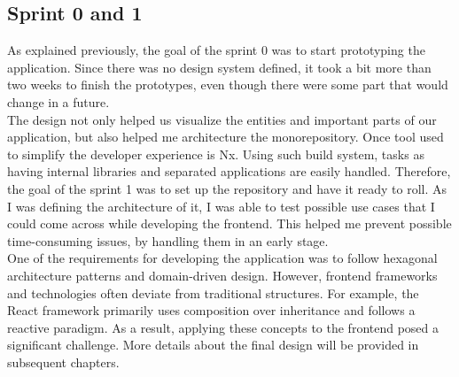 \documentclass[../memory.tex]{subfiles}
\begin{document}
\subsection{Sprint 0 and 1}
As explained previously, the goal of the sprint 0 was to start prototyping the
application. Since there was no design system defined, it took a bit more than
two weeks to finish the prototypes, even though there were some part that would
change in a future.
\\
The design not only helped us visualize the entities and important parts of our
application, but also helped me architecture the monorepository. Once tool used
to simplify the developer experience is Nx. Using such build system, tasks as
having internal libraries and separated applications are easily handled.
Therefore, the goal of the sprint 1 was to set up the repository and have it
ready to roll. As I was defining the architecture of it, I was able to test
possible use cases that I could come across while developing the frontend. This
helped me prevent possible time-consuming issues, by handling them in an early
stage.
\\
One of the requirements for developing the application was to follow hexagonal
architecture patterns and domain-driven design. However, frontend frameworks and
technologies often deviate from traditional structures. For example, the React
framework primarily uses composition over inheritance and follows a reactive
paradigm. As a result, applying these concepts to the frontend posed a
significant challenge. More details about the final design will be provided in
subsequent chapters.
\end{document}
